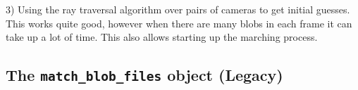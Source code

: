\documentclass[10pt,a4paper]{article}
\begin{document}
3) Using the ray traversal algorithm over pairs of cameras to get initial guesses. This works quite good, however when there are many blobs in each frame it can take up a lot of time. This also allows starting up the marching process.







\subsection{The \texttt{match\_blob\_files} object (Legacy)}
\end{document}

